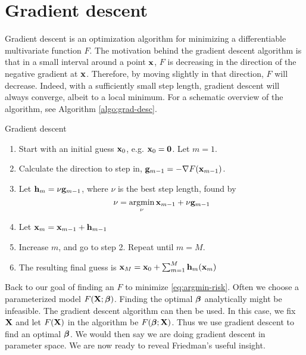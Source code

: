 \section{Gradient descent}
Gradient descent is an optimization algorithm for minimizing a differentiable multivariate function $F$. The motivation behind the gradient descent algorithm is that in a small interval around a point $\mathbf{x}$, $F$ is decreasing in the direction of the negative gradient at $\mathbf{x}$. Therefore, by moving slightly in that direction, $F$ will decrease. Indeed, with a sufficiently small step length, gradient descent will always converge, albeit to a local minimum. For a schematic overview of the algorithm, see Algorithm \ref{algo:grad-desc}.
\begin{algorithm}
\caption{Gradient descent}
\label{algo:grad-desc}
\begin{enumerate}
    \item Start with an initial guess $\mathbf{x}_0$, e.g. $\mathbf{x}_0=\mathbf{0}$. Let $m=1$.
    \item Calculate the direction to step in, $\mathbf{g}_{m-1}=-\nabla F(\mathbf{x}_{m-1})$.
    \item Let $\mathbf{h}_m=\nu \mathbf{g}_{m-1}$, where $\nu$ is the best step length, found by
        \begin{equation*}
            \nu=\operatorname*{argmin}_{\nu}\mathbf{x}_{m-1}+\nu \mathbf{g}_{m-1}
        \end{equation*}
    \item Let $\mathbf{x}_m=\mathbf{x}_{m-1}+\mathbf{h}_{m-1}$
    \item Increase $m$, and go to step 2. Repeat until $m=M$.
    \item The resulting final guess is $\mathbf{x}_M=\mathbf{x}_0+\sum_{m=1}^M\mathbf{h}_m(\mathbf{x}_m)$
\end{enumerate}
\end{algorithm}
Back to our goal of finding an $F$ to minimize \eqref{eq:argmin-risk}. Often we choose a parameterized model $F(\mathbf{X};\boldsymbol{\beta})$. Finding the optimal $\boldsymbol{\beta}$ analytically might be infeasible. The gradient descent algorithm can then be used. In this case, we fix $\mathbf{X}$ and let $F(\mathbf{X})$ in the algorithm be $F(\boldsymbol{\beta};\mathbf{X})$. Thus we use gradient descent to find an optimal $\boldsymbol{\beta}$. We would then say we are doing gradient descent in parameter space. We are now ready to reveal Friedman's useful insight.

